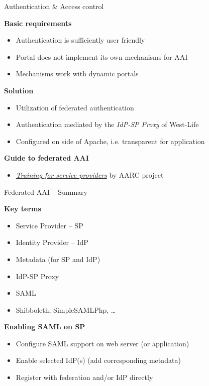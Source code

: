 \documentclass[smaller,t]{beamer}
\def\nadpis#1{\par\medskip\textbf{#1}}
\begin{document}
\begin{frame}{Authentication \& Access control}
\nadpis{Basic requirements}
\begin{itemize}
\item Authentication is sufficiently user friendly
\item Portal does not implement its own mechanisms for AAI
\item Mechanisms work with dynamic portals
\end{itemize}

\nadpis{Solution}
\begin{itemize}
\item Utilization of federated authentication
\item Authentication mediated by the \emph{IdP-SP Proxy} of West-Life
\item Configured on side of Apache, i.e. transparent for application
\end{itemize}

\nadpis{Guide to federated AAI}
\begin{itemize}
\item \emph{
\href{https://aarc-project.eu/workpackages/training-and-outreach/training-modules/training-for-service-provider-operators/}{Training
for service providers}} by AARC project
\end{itemize}

\end{frame}

\begin{frame}{Federated AAI -- Summary}
\nadpis{Key terms}
\begin{itemize}
\item Service Provider -- SP
\item Identity Provider -- IdP
\item Metadata (for SP and IdP)
\item IdP-SP Proxy
\item SAML
\item Shibboleth, SimpleSAMLPhp, \ldots
\end{itemize}

\nadpis{Enabling SAML on SP}
\begin{itemize}
\item Configure SAML support on web server (or application)
\item Enable selected IdP(s) (add corresponding metadata)
\item Register with federation and/or IdP directly
\end{itemize}
\end{frame}
\end{document}
